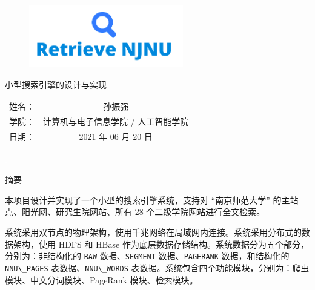 \documentclass{ctexart}
\newcommand{\code}[1]{\colorbox{backcolor}{\lstinline|#1|}}
\begin{document}
    \thispagestyle{firstpage}

    \begin{center}

        \vspace*{3cm}

        \begin{figure}[h]
            \centering
            \includegraphics[width=0.6\textwidth]{src/system-logo}
        \end{figure}

        \vspace*{1cm}

        {\Huge 小型搜索引擎的设计与实现}

        \vfill

        \begin{tabular}{cc}
            姓名： & 孙振强                 \\
            学院： & 计算机与电子信息学院 / 人工智能学院 \\
            日期： & 2021 年 06 月 20 日    \\
        \end{tabular}

    \end{center}

    \newpage

    \thispagestyle{firstpage}
    \textcolor{white}{.}
    \newpage

    \thispagestyle{abstract-cn}

    \begin{center}
        \LARGE 摘要
    \end{center}

    本项目设计并实现了一个小型的搜索引擎系统，支持对 “南京师范大学” 的主站点、阳光网、研究生院网站、所有 28 个二级学院网站进行全文检索。

    系统采用双节点的物理架构，使用千兆网络在局域网内连接。系统采用分布式的数据架构，使用 HDFS 和 HBase 作为底层数据存储结构。系统数据分为五个部分，分别为：非结构化的 \code{RAW} 数据、\code{SEGMENT} 数据、\code{PAGERANK} 数据，和结构化的 \code{NNU\_PAGES} 表数据、\code{NNU\_WORDS} 表数据。系统包含四个功能模块，分别为：爬虫模块、中文分词模块、PageRank 模块、检索模块。
\end{document}
